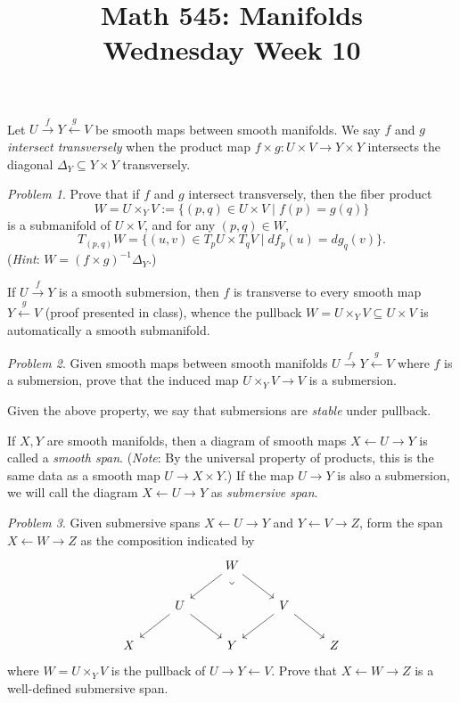 \documentclass[11pt,twoside]{amsart}
\title{Math 545: Manifolds\\ Wednesday Week 10}
\theoremstyle{plain}
\theoremstyle{remark}
\newtheorem{prob}{Problem}
\theoremstyle{definition}
\theoremstyle{definition}
\begin{document}
\maketitle

Let $U\xrightarrow{f}Y\xleftarrow{g}V$ be smooth maps between smooth manifolds. We say $f$ and $g$ \emph{intersect transversely} when the product map $f\times g\colon U\times V\to Y\times Y$ intersects the diagonal $\Delta_Y\subseteq Y\times Y$ transversely.

\begin{prob}
Prove that if $f$ and $g$ intersect transversely, then the fiber product
\[
  W = U\times_Y V := \{(p,q)\in U\times V\mid f(p)=g(q)\}
\]
is a submanifold of $U\times V$, and for any $(p,q)\in W$,
\[
  T_{(p,q)}W = \{(u,v)\in T_pU\times T_qV\mid df_p(u) = dg_q(v)\}.
\]
(\emph{Hint}: $W = (f\times g)^{-1}\Delta_Y$.)
\end{prob}

If $U\xrightarrow fY$ is a smooth submersion, then $f$ is transverse to every smooth map $Y\xleftarrow gV$ (proof presented in class), whence the pullback $W = U\times_YV\subseteq U\times V$ is automatically a smooth submanifold.

\begin{prob}
Given smooth maps between smooth manifolds $U\xrightarrow{f}Y\xleftarrow{g}V$ where $f$ is a submersion, prove that the induced map $U\times_YV\to V$ is a submersion.
\end{prob}

Given the above property, we say that submersions are \emph{stable} under pullback.

If $X,Y$ are smooth manifolds, then a diagram of smooth maps $X\leftarrow U\to Y$ is called a \emph{smooth span}. (\emph{Note}: By the universal property of products, this is the same data as a smooth map $U\to X\times Y$.) If the map $U\to Y$ is also a submersion, we will call the diagram $X\leftarrow U\to Y$ as \emph{submersive span}.

\begin{prob}
Given submersive spans $X\leftarrow U\to Y$ and $Y\leftarrow V\to Z$, form the span $X\leftarrow W\to Z$ as the composition indicated by
\[\begin{tikzcd}
  && W \\
  & U && V \\
  X && Y && Z
  \arrow[from=2-2, to=3-1]
  \arrow[from=2-2, to=3-3]
  \arrow[from=2-4, to=3-3]
  \arrow[from=1-3, to=2-2]
  \arrow[from=1-3, to=2-4]
  \arrow[from=2-4, to=3-5]
  \arrow["\lrcorner"{anchor=center, pos=0.125, rotate=-45}, draw=none, from=1-3, to=3-3]
\end{tikzcd}\]
where $W = U\times_YV$ is the pullback of $U\to Y\leftarrow V$. Prove that $X\leftarrow W\to Z$ is a well-defined submersive span.
\end{prob}
\end{document}
